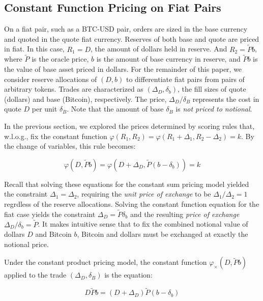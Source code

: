 \documentclass{article}
\begin{document}
\subsection{Constant Function Pricing on Fiat Pairs}

On a fiat pair, such as a BTC-USD pair, orders are sized in the base currency and quoted in the quote fiat currency. Reserves of both base and quote are priced in fiat. In this case, $R_1 = D$, the amount of dollars held in reserve. And $R_2 = \tilde{P} b$, where $\tilde{P}$ is the oracle price, $b$ is the amount of base currency in reserve, and $\tilde{P} b$ is the value of base asset priced in dollars. For the remainder of this paper, we consider reserve allocations of $(D, b)$ to differentiate fiat pairs from pairs of arbitrary tokens. Trades are characterized as $(\Delta_D, \delta_b)$, the fill sizes of quote (dollars) and base (Bitcoin), respectively. The price, $\Delta_D / \delta_B$ represents the cost in quote $D$ per unit $\delta_B$. Note that the amount of base $\delta_B$ is \emph{not priced to notional}.

In the previous section, we explored the prices determined by scoring rules that, w.l.o.g., fix the constant function $\varphi(R_1, R_2) = \varphi(R_1 + \Delta_1, R_2 - \Delta_2) = k$. By the change of variables, this rule becomes:

\begin{equation}
\varphi(D, \tilde{P}b) = \varphi(D + \Delta_D, \tilde{P}(b - \delta_b)) = k
\end{equation}

Recall that solving these equations for the constant sum pricing model yielded the constraint $\Delta_1 = \Delta_2$, requiring the \emph{unit price of exchange} to be $\Delta_1 / \Delta_2 = 1$ regrdless of the reserve allocations. Solving the constant function equation for the fiat case yields the constraint $\Delta_D = \tilde{P} \delta_b$ and the resulting \emph{price of exchange} $\Delta_D / \delta_b = \tilde{P}$. It makes intuitive sense that to fix the combined notional value of dollars $D$ and Bitcoin $b$, Bitcoin and dollars must be exchanged at exactly the notional price.

Under the constant product pricing model, the constant function $\varphi_{\times}(D, \tilde{P}b)$ applied to the trade $(\Delta_D, \delta_B)$ is the equation:

\begin{equation}
D \tilde{P} b = (D + \Delta_D) \tilde{P} (b - \delta_b)
\end{equation}
\end{document}

